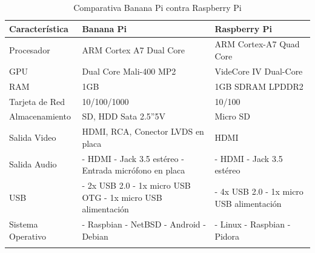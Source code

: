 \pagebreak
\begin{longtable}{|M{3.0cm}|M{4.5cm}|M{4.5cm}|}
	\hline
	\textbf{Característica} & \textbf{Banana Pi} & \textbf{Raspberry Pi} \\ 
	\hline
 	Procesador & ARM Cortex A7 Dual Core & ARM Cortex-A7 Quad Core \\
 	\hline
    GPU & Dual Core Mali-400 MP2 & VideCore IV Dual-Core\\
    \hline
    RAM & 1GB & 1GB SDRAM LPDDR2 \\
	\hline
	Tarjeta de Red & 10/100/1000 & 10/100\\
	\hline
	Almacenamiento & SD, HDD Sata 2.5''5V & Micro SD\\
	\hline
	Salida Video & HDMI, RCA, Conector LVDS en placa & HDMI\\
    \hline
    Salida Audio 
    & 
    \newline - HDMI 
    \newline - Jack 3.5 estéreo
    \newline - Entrada micrófono en placa 
    & 
    \newline - HDMI
    \newline - Jack 3.5 estéreo \\
    \hline
    USB & 
    \newline - 2x USB 2.0 
    \newline - 1x micro USB OTG
    \newline - 1x micro USB alimentación 
    & 
    \newline - 4x USB 2.0
    \newline - 1x micro USB alimentación \\
    \hline
    Sistema Operativo 
    & 
    \newline - Raspbian
    \newline - NetBSD
    \newline - Android
    \newline - Debian 
    &
    \newline - Linux
    \newline - Raspbian
    \newline - Pidora \\
    \hline
	\caption{Comparativa Banana Pi contra Raspberry Pi}
\end{longtable}

